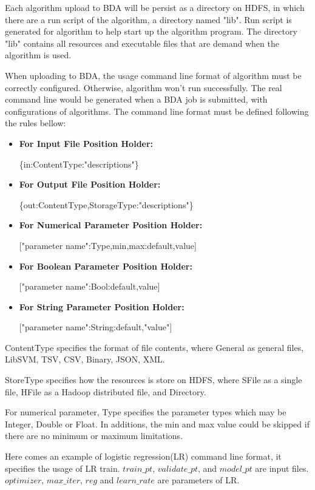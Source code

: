 \documentclass{sig-alternate-05-2015}
\begin{document}
Each algorithm upload to BDA will be persist as a directory on HDFS, in which there are a run script of the algorithm, a directory named "lib". Run script is generated for algorithm to help start up the algorithm program. The directory "lib" contains all resources and executable files that are demand when the algorithm is used.

When uploading to BDA, the usage command line format of algorithm must be correctly configured. Otherwise, algorithm won't run successfully. The real command line would be generated when a BDA job is submitted, with configurations of algorithms. The command line format must be defined following the rules bellow:

\begin{itemize}
\item \textbf{For Input File Position Holder:}

 \{in:ContentType:"descriptions"\}
\item \textbf{For Output File Position Holder:}

\{out:ContentType,StorageType:"descriptions"\}
\item \textbf{For Numerical Parameter Position Holder:}

["parameter name":Type,min,max:default,value]
\item \textbf{For Boolean Parameter Position Holder:}

["parameter name":Bool:default,value]
\item \textbf{For String Parameter Position Holder:}

 ["parameter name":String:default,"value"]
\end{itemize}

ContentType specifies the format of file contents, where General as general files, LibSVM, TSV, CSV, Binary, JSON, XML.

StoreType specifies how the resources is store on HDFS, where SFile as a single file, HFile as a Hadoop distributed file, and Directory.

For numerical parameter, Type specifies the parameter types which may be Integer, Double or Float. In additions, the min and max value could be skipped if there are no minimum or maximum limitations.

Here comes an example of logistic regression(LR) command line format, it specifies the usage of LR train. $train\_pt$, $validate\_pt$, and $model\_pt$ are input files. $optimizer$, $max\_iter$, $reg$ and $learn\_rate$ are parameters of LR.
\end{document}
